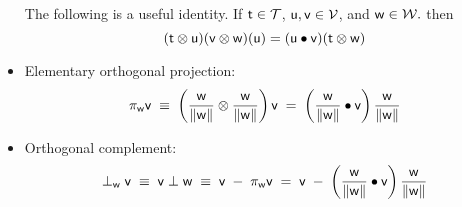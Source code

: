 \begin{itemize}
The following is a useful identity.
If $\mathsf{t} \in \mathcal{T}$, $\mathsf{u}, \mathsf{v} \in \mathcal{V}$, and $\mathsf{w} \in \mathcal{W}.$
then
\begin{equation}
\label{eq:tensor-dot}
(\mathsf{t} \otimes \mathsf{u}) (\mathsf{v} \otimes \mathsf{w})(\mathsf{u}) = (\mathsf{u} \bullet \mathsf{v}) (\mathsf{t} \otimes \mathsf{w})
\end{equation}


\item Elementary orthogonal projection:
\begin{equation}
\pi_{\mathsf{w}} \mathsf{v}
\; \equiv \;
\left( \frac{ \mathsf{w} }{ \| \mathsf{w} \| } \otimes \frac{ \mathsf{w} }{ \| \mathsf{w} \| } \right) \mathsf{v}
\; = \;
\left( \frac{\mathsf{w} }{\|\mathsf{w}\|} \bullet \mathsf{v} \right) \frac{\mathsf{w}}{\|\mathsf{w}\|}
\end{equation}

\item Orthogonal complement:
\begin{equation}
\perp_{\mathsf{w}} \mathsf{v}
\; \equiv \;
\mathsf{v} \perp \mathsf{w}
\; \equiv \;
\mathsf{v} \; - \; \pi_{\mathsf{w}} \mathsf{v}
\; = \;
\mathsf{v} \; - \; \left( \frac{\mathsf{w}}{\|\mathsf{w}\|} \bullet \mathsf{v} \right) \frac{\mathsf{w}}{\|\mathsf{w}\|}
\end{equation}

\end{itemize}

